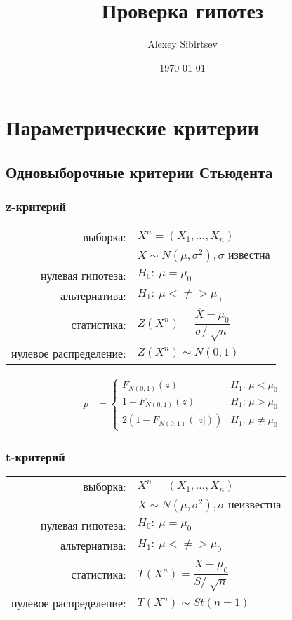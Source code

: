 \documentclass[a4paper,12pt]{article}
\author{Alexey Sibirtsev}
\title{Проверка гипотез}
\date{\today}
\begin{document}
\tableofcontents
\pagebreak

\section{Параметрические критерии}
\subsection{Одновыборочные критерии Стьюдента}

\subsubsection{z-критерий}

\begin{table}[h]
	\begin{tabular}{rl}
выборка:& $ X^{n} = \left( X_{1}, \ldots, X_{n} \right) $ \\
       & $ X \sim N( \mu, \sigma^{2}), \sigma \text{ известна} $ \\
нулевая гипотеза: & $ H_{0}:~\mu=\mu_{0} $ \\
альтернатива: & $ H_{1}:~\mu<\neq>\mu_{0} $ \\
статистика: & $ Z\left( X^{n} \right) = \dfrac{\overline{X}-\mu_{0}}{\sigma/\sqrt[]{n}} $ \\
нулевое распределение: & $ Z\left( X^{n} \right) \sim N( 0, 1) $
	\end{tabular}
\end{table}

\begin{align*}
p &=
	\begin{cases}
		F_{N(0,1)}(z) & H_{1}\text{: } \mu < \mu_{0} \\
        1-F_{N(0,1)}(z) & H_{1}\text{: } \mu > \mu_{0} \\
		2(1-F_{N(0,1)}(|z|)) & H_{1}\text{: } \mu \neq \mu_{0}
	\end{cases}
\end{align*}

\subsubsection{t-критерий}

\begin{table}[h]
	\begin{tabular}{rl}
выборка:& $ X^{n} = \left( X_{1}, \ldots, X_{n} \right) $ \\
       & $ X \sim N( \mu, \sigma^{2}), \sigma \text{ неизвестна} $ \\
нулевая гипотеза: & $ H_{0}:~\mu=\mu_{0} $ \\
альтернатива: & $ H_{1}:~\mu<\neq>\mu_{0} $ \\
статистика: & $ T\left( X^{n} \right) = \dfrac{\overline{X}-\mu_{0}}{S/\sqrt[]{n}} $ \\
нулевое распределение: & $ T\left( X^{n} \right) \sim St(n-1) $
	\end{tabular}
\end{table}
\end{document}
